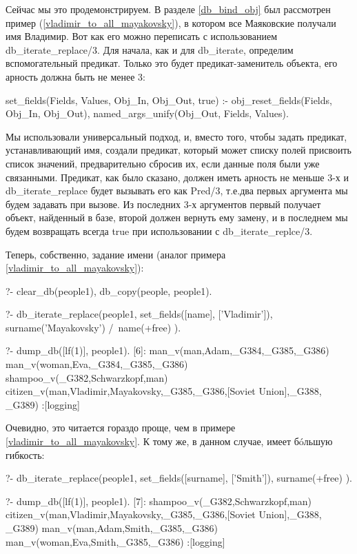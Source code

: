 \documentclass[a4paper]{book}
\def\te{т.\thinspace е.}
\begin{document}
Сейчас мы это продемонстрируем. В разделе \ref{db_bind_obj}
был рассмотрен пример (\ref{vladimir_to_all_mayakovsky}), в
котором все Маяковские получали имя Владимир. Вот как его можно
переписать с использованием db_iterate_replace/3. Для начала, как
и для db_iterate, определим вспомогательный предикат. Только это
будет предикат-заменитель объекта, его арность должна быть не
менее 3:

\begin{example}{}{}
set_fields(Fields, Values, Obj_In, Obj_Out, true) :- 
   obj_reset_fields(Fields, Obj_In, Obj_Out), 
   named_args_unify(Obj_Out, Fields, Values). 
\end{example}

Мы использовали универсальный подход, и, вместо того, чтобы
задать предикат, устанавливающий имя, создали предикат, который
может списку полей присвоить список значений, предварительно
сбросив их, если данные поля были уже связанными. Предикат, как
было сказано, должен иметь арность не меньше 3-х и
db_iterate_replace будет вызывать его как Pred/3, \te два первых
аргумента мы будем задавать при вызове. Из последних 3-х
аргументов первый получает объект, найденный в базе, второй
должен вернуть ему замену, и в последнем мы будем возвращать
всегда true при использовании с db_iterate_replce/3.

Теперь, собственно, задание имени (аналог примера
\ref{vladimir_to_all_mayakovsky}):

\begin{example}{}{}
?- clear_db(people1), db_copy(people, people1).

?- db_iterate_replace(people1, 
      set_fields([name], ['Vladimir']), 
      surname('Mayakovsky') /\ name(+free)
      ).

?- dump_db([lf(1)], people1).
[6]: man_v(man,Adam,_G384,_G385,_G386) 
man_v(woman,Eva,_G384,_G385,_G386) 
shampoo_v(_G382,Schwarzkopf,man) 
citizen_v(man,Vladimir,Mayakovsky,_G385,_G386,[Soviet Union],_G388,
_G389)                                                            
 :[logging]
\end{example}

Очевидно, это читается гораздо проще, чем в примере
\ref{vladimir_to_all_mayakovsky}. К тому же, в данном случае,
имеет б\'oльшую гибкость:

\begin{example}{}{}
?- db_iterate_replace(people1, 
      set_fields([surname], ['Smith']), 
      surname(+free)
   ). 

?- dump_db([lf(1)], people1).
[7]: shampoo_v(_G382,Schwarzkopf,man) 
citizen_v(man,Vladimir,Mayakovsky,_G385,_G386,[Soviet Union],_G388,
_G389)                                                            
man_v(man,Adam,Smith,_G385,_G386) 
man_v(woman,Eva,Smith,_G385,_G386) 
 :[logging]
\end{example}
\end{document}

